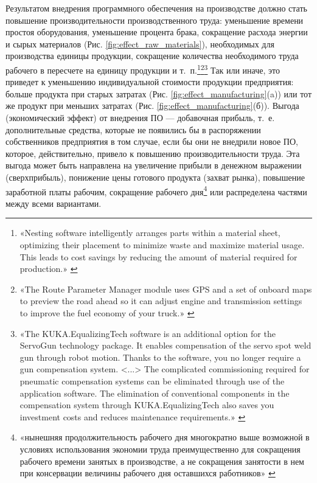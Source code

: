 \documentclass{article}
\begin{document}
Результатом внедрения программного обеспечения на производстве должно стать повышение производительности производственного труда: уменьшение времени простоя оборудования, уменьшение процента брака, сокращение расхода энергии и сырых материалов (Рис. \ref{fig:effect_raw_materials}), необходимых для производства единицы продукции, сокращение количества необходимого труда рабочего в пересчете на единицу продукции и т. п.\footnote{«Nesting software intelligently arranges parts within a material sheet, optimizing their placement to minimize waste and maximize material usage. This leads to cost savings by reducing the amount of material required for production.» \cite{autodeskNesting}}\footnote{«The Route Parameter Manager module uses GPS and a set of onboard maps to preview the road ahead so it can adjust engine and transmission settings to improve the fuel economy of your truck.» \cite{cumminsAdept}}\footnote{«The KUKA.EqualizingTech software is an additional option for the ServoGun technology package. It enables compensation of the servo spot weld gun through robot motion. Thanks to the software, you no longer require a gun compensation system. <...> The complicated commissioning required for pneumatic compensation systems can be eliminated through use of the application software. The elimination of conventional components in the compensation system through KUKA.EqualizingTech also saves you investment costs and reduces maintenance requirements.» \cite{kukaEqulizingTech}} Так или иначе, это приведет к уменьшению индивидуальной стоимости продукции предприятия: больше продукта при старых затратах (Рис. \ref{fig:effect_manufacturing}(a)) или тот же продукт при меньших затратах (Рис. \ref{fig:effect_manufacturing}(б)). Выгода (экономический эффект) от внедрения ПО — добавочная прибыль, т. е. дополнительные средства, которые не появились бы в распоряжении собственников предприятия в том случае, если бы они не внедрили новое ПО, которое, действительно, привело к повышению производительности труда. Эта выгода может быть направлена на увеличение прибыли в денежном выражении (сверхприбыль), понижение цены готового продукта (захват рынка), повышение заработной платы рабочим, сокращение рабочего дня\footnote{«нынешняя продолжительность рабочего дня многократно выше возможной в условиях использования экономии труда преимущественно для сокращения рабочего времени занятых в производстве, а не сокращения занятости в нем при консервации величины рабочего дня оставшихся работников» \cite{workingTime2020}} или распределена частями между всеми вариантами.
\end{document}
